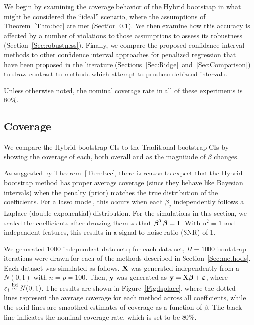 We begin by examining the coverage behavior of the Hybrid bootstrap in what might be considered the ``ideal'' scenario, where the assumptions of Theorem~\ref{Thm:bcc} are met (Section~\ref{Sec:Coverage}). We then examine how this accuracy is affected by a number of violations to those assumptions to assess its robustness (Section~\ref{Sec:robustness}). Finally, we compare the proposed confidence interval methods to other confidence interval approaches for penalized regression that have been proposed in the literature (Sections~\ref{Sec:Ridge}~and~\ref{Sec:Comparison}) to draw contrast to methods which attempt to produce debiased intervals.

Unless otherwise noted, the nominal coverage rate in all of these experiments is 80\%.

\subsection{Coverage}\label{Sec:Coverage}

We compare the Hybrid bootstrap CIs to the Traditional bootstrap CIs by showing the coverage of each, both overall and as the magnitude of $\beta$ changes.

As suggested by Theorem~\ref{Thm:bcc}, there is reason to expect that the Hybrid bootstrap method has proper average coverage  (since they behave like Bayesian intervals) when the penalty (prior) matches the true distribution of the coefficients. For a lasso model, this occurs when each $\beta_j$ independently follows a Laplace (double exponential) distribution. For the simulations in this section, we scaled the coefficients after drawing them so that $\boldsymbol{\beta}^T\boldsymbol{\beta} = 1$. With $\sigma^2=1$ and independent features, this results in a signal-to-noise ratio (SNR) of 1.

We generated 1000 independent data sets; for each data set, $B = 1000$ bootstrap iterations were drawn for each of the methods described in Section~\ref{Sec:methods}. Each dataset was simulated as follows. $\mathbf{X}$ was generated independently from a $N(0, 1)$ with $n = p = 100$. Then, $\mathbf{y}$ was generated as $\mathbf{y} = \mathbf{X}\boldsymbol{\beta} + \boldsymbol{\varepsilon}$, where $\varepsilon_i \overset{\text{iid}}{\sim} N(0, 1)$. The results are shown in Figure~\ref{Fig:laplace}, where the dotted lines represent the average coverage for each method across all coefficients, while the solid lines are smoothed estimates of coverage as a function of $\beta$. The black line indicates the nominal coverage rate, which is set to be 80\%.

